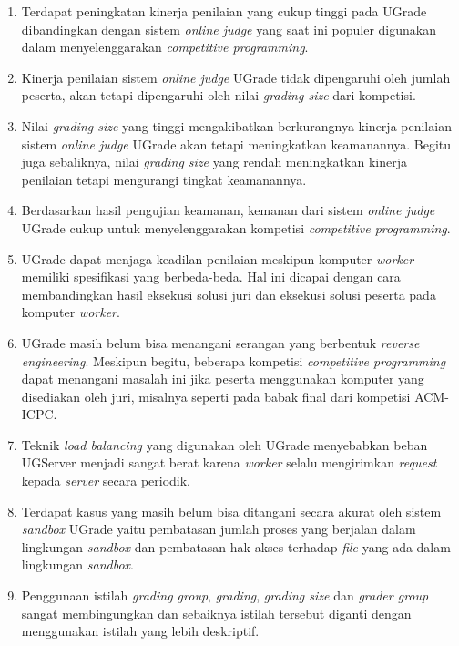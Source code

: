 \begin{enumerate}
    \item Terdapat peningkatan kinerja penilaian yang cukup tinggi pada UGrade dibandingkan dengan sistem \textit{online judge} yang saat ini populer digunakan dalam menyelenggarakan \textit{competitive programming}.
    \item Kinerja penilaian sistem \textit{online judge} UGrade tidak dipengaruhi oleh jumlah peserta, akan tetapi dipengaruhi oleh nilai \textit{grading size} dari kompetisi.
    \item Nilai \textit{grading size} yang tinggi mengakibatkan berkurangnya kinerja penilaian sistem \textit{online judge} UGrade akan tetapi meningkatkan keamanannya. Begitu juga sebaliknya, nilai \textit{grading size} yang rendah meningkatkan kinerja penilaian tetapi mengurangi tingkat keamanannya.
    \item Berdasarkan hasil pengujian keamanan, kemanan dari sistem \textit{online judge} UGrade cukup untuk menyelenggarakan kompetisi \textit{competitive programming}.
    \item UGrade dapat menjaga keadilan penilaian meskipun komputer \textit{worker} memiliki spesifikasi yang berbeda-beda. Hal ini dicapai dengan cara membandingkan hasil eksekusi solusi juri dan eksekusi solusi peserta pada komputer \textit{worker}.
    \item UGrade masih belum bisa menangani serangan yang berbentuk \textit{reverse engineering}. Meskipun begitu, beberapa kompetisi \textit{competitive programming} dapat menangani masalah ini jika peserta menggunakan komputer yang disediakan oleh juri, misalnya seperti pada babak final dari kompetisi ACM-ICPC.
    \item Teknik \textit{load balancing} yang digunakan oleh UGrade menyebabkan beban UGServer menjadi sangat berat karena \textit{worker} selalu mengirimkan \textit{request} kepada \textit{server} secara periodik.
    \item Terdapat kasus yang masih belum bisa ditangani secara akurat oleh sistem \textit{sandbox} UGrade yaitu pembatasan jumlah proses yang berjalan dalam lingkungan \textit{sandbox} dan pembatasan hak akses terhadap \textit{file} yang ada dalam lingkungan \textit{sandbox}.
    \item Penggunaan istilah \textit{grading group}, \textit{grading}, \textit{grading size} dan \textit{grader group} sangat membingungkan dan sebaiknya istilah tersebut diganti dengan menggunakan istilah yang lebih deskriptif.
\end{enumerate}

